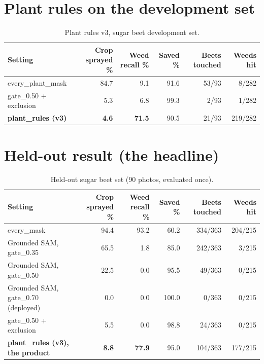 \section{Plant rules on the development set}
\begin{table}[H]
\centering
\caption{Plant rules v3, sugar beet development set.}\label{tab:rulesdev}
\begin{small}
\begin{tabularx}{\textwidth}{@{}L{4.3cm}RRRRR@{}}
\toprule
\textbf{Setting} & \textbf{Crop sprayed \%} & \textbf{Weed recall \%} & \textbf{Saved \%} & \textbf{Beets touched} & \textbf{Weeds hit}\\
\midrule
every\_\allowbreak plant\_\allowbreak mask & 84.7 & 9.1 & 91.6 & 53/93 & 8/282\\
gate\_0.50 + exclusion & 5.3 & 6.8 & 99.3 & 2/93 & 1/282\\
\textbf{plant\_rules (v3)} & \textbf{4.6} & \textbf{71.5} & 90.5 & 21/93 & 219/282\\
\bottomrule
\end{tabularx}
\end{small}
\end{table}

\section{Held-out result (the headline)}\label{sec:holdout}
\begin{table}[H]
\centering
\caption{Held-out sugar beet set (90 photos, evaluated once).}\label{tab:holdout}
\begin{small}
\begin{tabularx}{\textwidth}{@{}L{4.3cm}RRRRR@{}}
\toprule
\textbf{Setting} & \textbf{Crop sprayed \%} & \textbf{Weed recall \%} & \textbf{Saved \%} & \textbf{Beets touched} & \textbf{Weeds hit}\\
\midrule
every\_mask & 94.4 & 93.2 & 60.2 & 334/363 & 204/215\\
Grounded SAM, gate\_0.35 & 65.5 & 1.8 & 85.0 & 242/363 & 3/215\\
Grounded SAM, gate\_0.50 & 22.5 & 0.0 & 95.5 & 49/363 & 0/215\\
Grounded SAM, gate\_0.70 (deployed) & 0.0 & 0.0 & 100.0 & 0/363 & 0/215\\
gate\_0.50 + exclusion & 5.5 & 0.0 & 98.8 & 24/363 & 0/215\\
\textbf{plant\_rules (v3), the product} & \textbf{8.8} & \textbf{77.9} & 95.0 & 104/363 & 177/215\\
\bottomrule
\end{tabularx}
\end{small}
\end{table}

